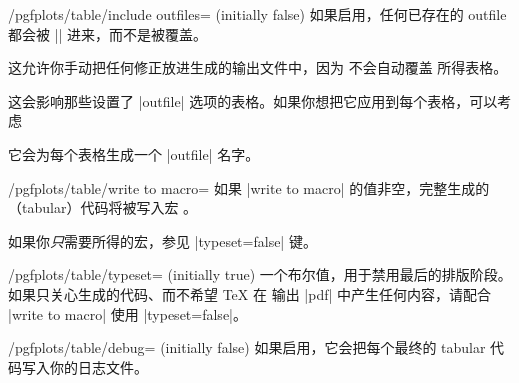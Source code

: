 \documentclass[a4paper,doc2]{ltxdoc}
\begin{document}
\begin{key}{/pgfplots/table/include outfiles= (initially false)}
    如果启用，任何已存在的 outfile 都会被 || 进来，而不是被覆盖。
\begin{codeexample}
\end{codeexample}
    这允许你手动把任何修正放进生成的输出文件中，因为 \PGFPlotstable{} 不会自动覆盖
    所得表格。

    这会影响那些设置了 |outfile| 选项的表格。如果你想把它应用到每个表格，可以考虑
\begin{codeexample}
\end{codeexample}
    \noindent 它会为每个表格生成一个 |outfile| 名字。
\end{key}


\begin{key}{/pgfplots/table/write to macro=}
    如果 |write to macro| 的值非空，完整生成的（tabular）代码将被写入宏
    。

    如果你\emph{只}需要所得的宏，参见 |typeset=false| 键。
\end{key}


\begin{key}{/pgfplots/table/typeset= (initially true)}
    一个布尔值，用于禁用最后的排版阶段。如果只关心生成的代码、而不希望 \TeX{} 在
    输出 |pdf| 中产生任何内容，请配合 |write to macro| 使用 |typeset=false|。
\end{key}

\begin{key}{/pgfplots/table/debug= (initially false)}
    如果启用，它会把每个最终的 tabular 代码写入你的日志文件。
\end{key}
\end{document}
